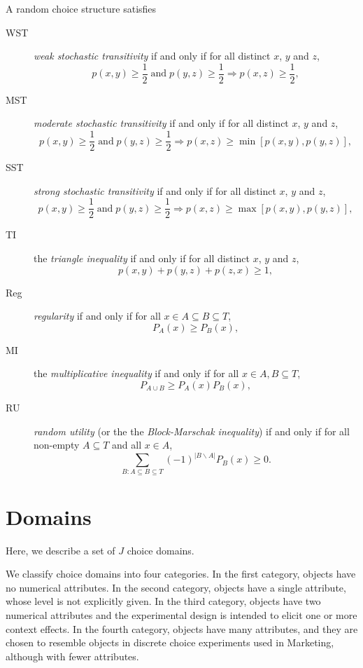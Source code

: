 \documentclass[11pt,letter]{article}
\begin{document}
A random choice structure satisfies
\begin{description}
	\item[WST] {\em weak stochastic transitivity} if and only if for all distinct
	$x$, $y$ and $z$,
	\[
		p(x,y) \geq \frac{1}{2}\;\mbox{and}\; p(y,z) \geq \frac{1}{2}
		\Rightarrow p(x,z) \geq \frac{1}{2},
	\]
	\item[MST] {\em moderate stochastic transitivity} if and only if for all distinct
	$x$, $y$ and $z$,
	\[
		p(x,y) \geq \frac{1}{2}\;\mbox{and}\; p(y,z) \geq \frac{1}{2}
		\Rightarrow p(x,z) \geq \min[ p(x,y), p(y,z) ],
	\]
	\item[SST] {\em strong stochastic transitivity} if and only if for all distinct
	$x$, $y$ and $z$,
	\[
		p(x,y) \geq \frac{1}{2}\;\mbox{and}\; p(y,z) \geq \frac{1}{2}
		\Rightarrow p(x,z) \geq \max[ p(x,y), p(y,z) ],
	\]
	\item[TI] the {\em triangle inequality} if and only if for all distinct
	$x$, $y$ and $z$,
	\[
		p(x,y) + p(y,z) + p(z,x) \geq 1,
	\]
	\item[Reg] {\em regularity} if and only if for all $x \in A \subseteq B \subseteq T$,
	\[
		P_A(x) \geq P_B(x),
	\]
	\item[MI] the {\em multiplicative inequality} if and only if for all $x \in A, B \subseteq T$,
	\[
		P_{A \cup B} \geq P_A(x) P_B(x),
	\]
	\item[RU] {\em random utility} (or the the {\em Block-Marschak inequality}) if and only if for all non-empty
	$A \subseteq T$ and all $x \in A$,
	\begin{equation}\label{e:BMP}
		\sum_{B \colon A \subseteq B \subseteq T} (-1)^{|B \backslash A|} P_B(x) \geq 0.
	\end{equation}
\end{description}


\section{Domains}\label{s:domains}

Here, we describe a set of $J$ choice domains.

We classify choice domains into four categories.
In the first category, objects have no numerical attributes.
In the second category, objects have a single attribute, whose level is not explicitly given. In the third category, objects have two numerical attributes and the experimental design is intended to elicit one or more context effects.
In the fourth category, objects have many attributes, and they are chosen to resemble objects in discrete choice experiments used in Marketing, although with fewer attributes.
\end{document}
